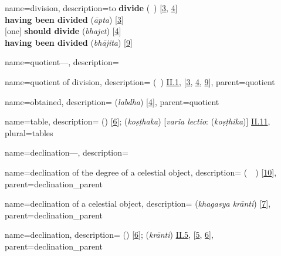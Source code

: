 {
        name={division},
        description={\newline to \textbf{divide}\quad{} (\qismat\ \kardan) [\hyperlink{PEpass3}{3}, \hyperlink{PEpass4}{4}]\\[.2\baselineskip]
        \textbf{having been divided}\quad {} (\textit{āpta}) [\hyperlink{SEpass3}{3}] \\[.2\baselineskip]
        {[one]} \textbf{should divide}\quad {} (\textit{bhajet}) [\hyperlink{SEpass4}{4}] \\[.2\baselineskip]
        \textbf{having been divided}\quad {} (\textit{bhājita}) [\hyperlink{SEpass9}{9}]}
}   

{
        name={quotient---},
        description={\phantom{x}\nopagebreak}
}

{
        name={quotient of division},
        description={ (\kharij\idafaconsonant\ \qismat) \hyperlink{Pii1}{II.1}, [\hyperlink{PEpass3}{3}, \hyperlink{PEpass4}{4}, \hyperlink{PEpass9}{9}]},
        parent={quotient}
}

{
        name={obtained},
        description={ (\textit{labdha}) [\hyperlink{SEpass4}{4}]},
        parent={quotient}
}

{
        name={table},
        description={ (\jadval) [\hyperlink{PEpass6}{6}];  (\textit{koṣṭhaka}) [\textit{varia lectio}:  (\textit{koṣṭhika})]  \hyperlink{Sii11}{II.11}},
        plural={tables}
}        

{
        name={declination---},
        description={\phantom{x}\nopagebreak}
}

{
        name={declination of the degree of a celestial object},
        description={ (\mayl\idafaconsonant\ \daraji\idafavowel\ \kawkab) [\hyperlink{PEpass10}{10}]},
        parent={declination_parent}
}  

{
        name={declination of a celestial object},
        description={ (\textit{khagasya krānti}) [\hyperlink{SEpass7}{7}]},
        parent={declination_parent}
}

{
        name={declination},
        description={ (\mayl) [\hyperlink{PEpass6}{6}];  (\textit{krānti}) \hyperlink{Sii5}{II.5}, [\hyperlink{SEpass5}{5}, \hyperlink{SEpass6}{6}]},
        parent={declination_parent}
}

